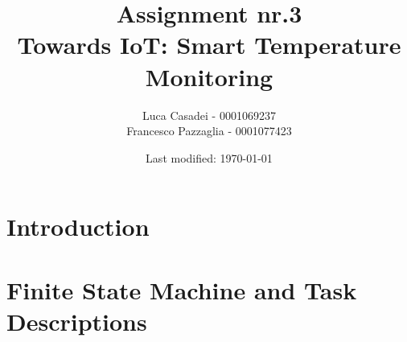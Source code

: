 \documentclass[a4paper]{article}
\author{Luca Casadei - 0001069237\\Francesco Pazzaglia - 0001077423}
\date{Last modified: \today}
\title{\textbf{Assignment nr.3\\Towards IoT: Smart Temperature Monitoring}}
\begin{document}
	\maketitle
	\tableofcontents
	\section{Introduction}
		
	\section{Finite State Machine and Task Descriptions}
	
\end{document}
